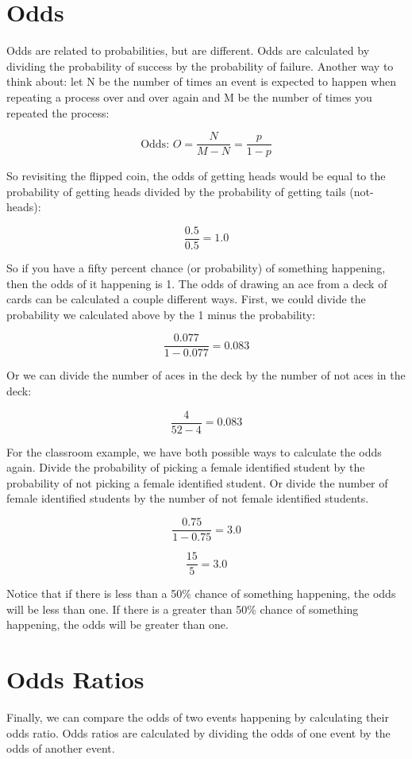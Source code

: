 \documentclass[11pt]{amsart}
\begin{document}
\section{Odds}

Odds are related to probabilities, but are different. Odds are calculated by dividing the probability of success by the probability of failure. Another way to think about: let N be the number of times an event is expected to happen when repeating a process over and over again and M be the number of times you repeated the process:

\[ \text{Odds: } O = \frac{N}{M-N} = \frac{p}{1-p} \]

So revisiting the flipped coin, the odds of getting heads would be equal to the probability of getting heads divided by the probability of getting tails (not-heads):

\[ \frac{0.5}{0.5} = 1.0 \]

So if you have a fifty percent chance (or probability) of something happening, then the odds of it happening is 1. The odds of drawing an ace from a deck of cards can be calculated a couple different ways. First, we could divide the probability we calculated above by the 1 minus the probability:

\[ \frac{0.077}{1-0.077} = 0.083 \]

Or we can divide the number of aces in the deck by the number of not aces in the deck:

\[ \frac{4}{52-4} = 0.083 \]

For the classroom example, we have both possible ways to calculate the odds again. Divide the probability of picking a female identified student by the probability of not picking a female identified student. Or divide the number of female identified students by the number of not female identified students.

\[ \frac{0.75}{1-0.75} = 3.0 \]

\[ \frac{15}{5} = 3.0 \]

Notice that if there is less than a 50\% chance of something happening, the odds will be less than one. If there is a greater than 50\% chance of something happening, the odds will be greater than one.

\newpage

\section{Odds Ratios}

Finally, we can compare the odds of two events happening by calculating their odds ratio. Odds ratios are calculated by dividing the odds of one event by the odds of another event.
\end{document}

